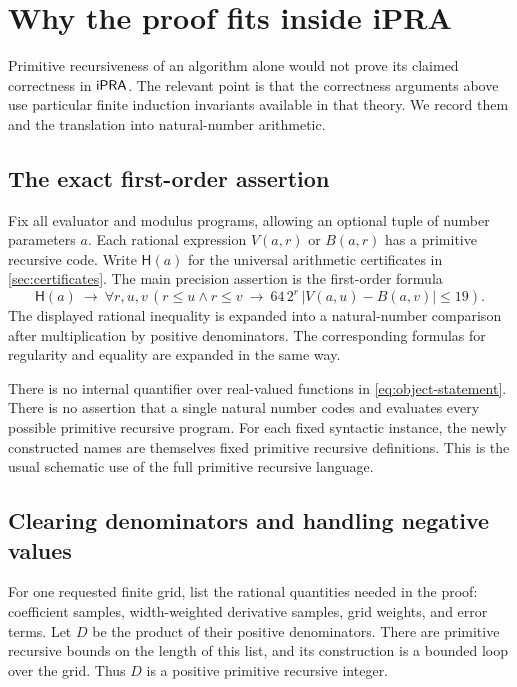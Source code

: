 \section{Why the proof fits inside iPRA}\label{sec:ipra-audit}

Primitive recursiveness of an algorithm alone would not prove its claimed
correctness in $\mathsf{iPRA}$. The relevant point is that the correctness
arguments above use particular finite induction invariants available
in that theory. We record them and the translation into natural-number
arithmetic.

\subsection{The exact first-order assertion}

Fix all evaluator and modulus programs, allowing an optional tuple of
number parameters $a$. Each rational expression $V(a,r)$ or $B(a,r)$
has a primitive recursive code. Write $\mathsf H(a)$ for the universal
arithmetic certificates in \cref{sec:certificates}.
The main precision assertion is the first-order formula
\begin{equation}\label{eq:object-statement}
 \mathsf H(a)\ \longrightarrow\
 \forall r,u,v\,
 \left(r\le u\wedge r\le v\ \longrightarrow\
       64\,2^r\,|V(a,u)-B(a,v)|\le19\right).
\end{equation}
The displayed rational inequality is expanded into a natural-number
comparison after multiplication by positive denominators. The corresponding
formulas for regularity and equality are expanded in the same way.

There is no internal quantifier over real-valued functions in
\eqref{eq:object-statement}. There is no assertion that a single natural
number codes and evaluates every possible primitive recursive program.
For each fixed syntactic instance, the newly constructed names are
themselves fixed primitive recursive definitions. This is the usual
schematic use of the full primitive recursive language.

\subsection{Clearing denominators and handling negative values}

For one requested finite grid, list the rational quantities needed in
the proof: coefficient samples, width-weighted derivative samples,
grid weights, and error terms. Let $D$ be the product of their positive
denominators. There are primitive recursive bounds on the length of
this list, and its construction is a bounded loop over the grid.
Thus $D$ is a positive primitive recursive integer.

